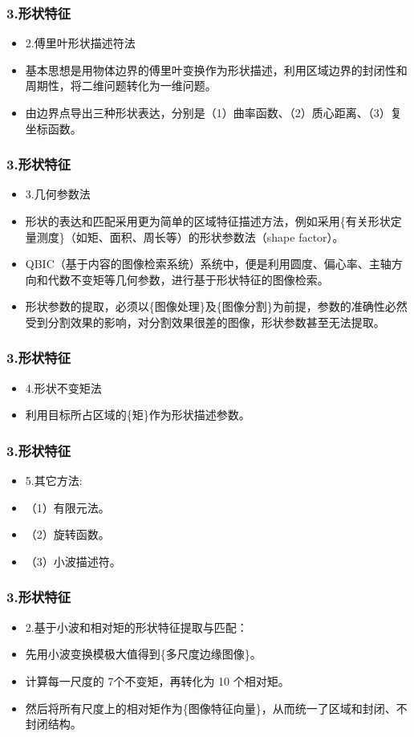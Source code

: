 \documentclass[notheorems,mathserif,table,compress]{beamer}  %
\begin{document}
\begin{frame}
  \frametitle{3.形状特征}
  \begin{itemize}
  \item 2.傅里叶形状描述符法
  \item 基本思想是用物体边界的傅里叶变换作为形状描述，利用区域边界的封闭性和周期性，将二维问题转化为一维问题。
  \item 由边界点导出三种形状表达，分别是（1）曲率函数、（2）质心距离、（3）复坐标函数。
  \end{itemize}
\end{frame}

\begin{frame}
  \frametitle{3.形状特征}
  \begin{itemize}
  \item 3.几何参数法
  \item 形状的表达和匹配采用更为简单的区域特征描述方法，例如采用\{有关形状定量测度\}（如矩、面积、周长等）的形状参数法（shape factor）。
  \item QBIC（基于内容的图像检索系统）系统中，便是利用圆度、偏心率、主轴方向和代数不变矩等几何参数，进行基于形状特征的图像检索。
  \item 形状参数的提取，必须以\{图像处理\}及\{图像分割\}为前提，参数的准确性必然受到分割效果的影响，对分割效果很差的图像，形状参数甚至无法提取。
  \end{itemize}
\end{frame}

\begin{frame}
  \frametitle{3.形状特征}
  \begin{itemize}
  \item 4.形状不变矩法
  \item 利用目标所占区域的\{矩\}作为形状描述参数。
  \end{itemize}
\end{frame}

\begin{frame}
  \frametitle{3.形状特征}
  \begin{itemize}
  \item 5.其它方法:
  \item （1）有限元法。
  \item （2）旋转函数。
  \item （3）小波描述符。
  \end{itemize}
\end{frame}

\begin{frame}
  \frametitle{3.形状特征}
  \begin{itemize}
  \item 2.基于小波和相对矩的形状特征提取与匹配：
  \item 先用小波变换模极大值得到\{多尺度边缘图像\}。
  \item 计算每一尺度的 7个不变矩，再转化为 10 个相对矩。
  \item 然后将所有尺度上的相对矩作为\{图像特征向量\}，从而统一了区域和封闭、不封闭结构。
  \end{itemize}
\end{frame}
\end{document}
